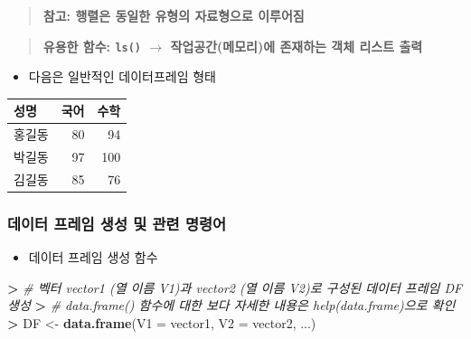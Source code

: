 \documentclass[11pt,a4paper]{book}
\newenvironment{Shaded}{\begin{snugshade}}{\end{snugshade}}
\newcommand{\KeywordTok}[1]{\textcolor[rgb]{0.13,0.29,0.53}{\textbf{#1}}}
\newcommand{\DataTypeTok}[1]{\textcolor[rgb]{0.13,0.29,0.53}{#1}}
\newcommand{\StringTok}[1]{\textcolor[rgb]{0.31,0.60,0.02}{#1}}
\newcommand{\CommentTok}[1]{\textcolor[rgb]{0.56,0.35,0.01}{\textit{#1}}}
\newcommand{\OperatorTok}[1]{\textcolor[rgb]{0.81,0.36,0.00}{\textbf{#1}}}
\newcommand{\ErrorTok}[1]{\textcolor[rgb]{0.64,0.00,0.00}{\textbf{#1}}}
\newcommand{\NormalTok}[1]{#1}
\providecommand{\tightlist}{%
  \setlength{\itemsep}{0pt}\setlength{\parskip}{0pt}}
\theoremstyle{definition}
\theoremstyle{definition}
\theoremstyle{definition}
\theoremstyle{remark}
\begin{document}
\begin{quote}
\textbf{참고: 행렬은 동일한 유형의 자료형으로 이루어짐}
\end{quote}

\begin{quote}
\textbf{유용한 함수: \texttt{ls()} \(\rightarrow\) 작업공간(메모리)에
존재하는 객체 리스트 출력}
\end{quote}

\begin{itemize}
\tightlist
\item
  다음은 일반적인 데이터프레임 형태
\end{itemize}

\footnotesize

\begin{tabular}{l|r|r}
\hline
성명 & 국어 & 수학\\
\hline
홍길동 & 80 & 94\\
\hline
박길동 & 97 & 100\\
\hline
김길동 & 85 & 76\\
\hline
\end{tabular}

\normalsize

\subsubsection{데이터 프레임 생성 및 관련 명령어}\label{-----}

\begin{itemize}
\tightlist
\item
  데이터 프레임 생성 함수
\end{itemize}

\footnotesize

\begin{Shaded}
\begin{Highlighting}[]
\OperatorTok{>}\StringTok{ }\CommentTok{# 벡터 vector1 (열 이름 V1)과 vector2 (열 이름 V2)로 구성된 데이터 프레임 DF 생성}
\ErrorTok{>}\StringTok{ }\CommentTok{# data.frame() 함수에 대한 보다 자세한 내용은 help(data.frame)으로 확인}
\ErrorTok{>}\StringTok{ }\NormalTok{DF <-}\StringTok{ }\KeywordTok{data.frame}\NormalTok{(}\DataTypeTok{V1 =}\NormalTok{ vector1, }\DataTypeTok{V2 =}\NormalTok{ vector2, ...)}
\end{Highlighting}
\end{Shaded}

\normalsize
\end{document}
